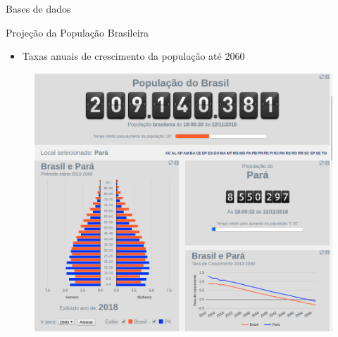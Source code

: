 \begin{frame}{Bases de dados}
  \begin{block}{Projeção da População Brasileira}
    \begin{itemize}
      \item Taxas anuais de crescimento da população até 2060
    \end{itemize}
  \end{block}
  \begin{figure}[h]
  	\begin{center}
      \includegraphics [scale=0.23]{./Figures/ibge-pop}
  	\end{center}
  \end{figure}
\end{frame}

